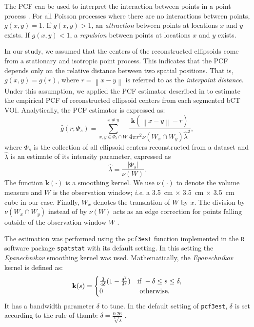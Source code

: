 \documentclass[journal]{IEEEtran}
\newcommand{\norm}[1]{\left\lVert#1\right\rVert}%
\begin{document}
The PCF can be used to interpret the interaction between points in a
point process \cite{illian2008statistical}. For all Poisson processes
where there are no interactions between points, $g(x,y)=1$. If
$g(x,y)>1$, an \textit{attraction} between points at locations $x$ and
$y$ exists. If $g(x,y)<1$, a \textit{repulsion} between points at
locations $x$ and $y$ exists.

In our study, we assumed that the centers of the reconstructed
ellipsoids come from a stationary and isotropic point process. This
indicates that the PCF depends only on the relative distance between
two spatial positions. That is, $g(x, y) = g(r)$, where
$r = \norm{x-y}$ is referred to as the \textit{interpoint
  distance}. Under this assumption, we applied the PCF estimator
described in \cite[p232]{illian2008statistical} to estimate the
empirical PCF of reconstructed ellipsoid centers from each segmented
bCT VOI. Analytically, the PCF estimator is expressed as:
\begin{equation}
  \label{eq:pcf-estimator}
  \hat{g}(r; \Phi_s) = \sum^{x \neq y}_{x, y \in \Phi_s \cap W}
  \frac{\mathbf{k}(\norm{x-y} - r)}
  {4 \pi r^2 \nu(W_x \cap W_y) \hat{\lambda}^2},
\end{equation}
where $\Phi_s$ is the collection of all ellipsoid centers
reconstructed from a dataset and $\hat{\lambda}$ is an estimate of its
intensity parameter, expressed as
\begin{equation}
  \label{eq:inten-estimtor}
  \hat{\lambda} = \frac{|\Phi_s|}{\nu(W)}.
\end{equation}
The function $\mathbf{k}(\cdot)$ is a smoothing kernel. We use
$\nu(\cdot)$ to denote the volume measure and $W$ is the observation
window; \textit{i.e.} a \SI{3.5}{\cm} $\times$ \SI{3.5}{\cm} $\times$
\SI{3.5}{\cm} cube in our case. Finally, $W_x$ denotes the translation
of $W$ by $x$. The division by $\nu(W_x \cap W_y)$ instead of by
$\nu(W)$ acts as an edge correction for points falling outside of the
observation window $W$ \cite{ohser1983estimators}.

The estimation was performed using the \texttt{pcf3est} function
implemented in the \texttt{R} software package \texttt{spatstat}
\cite{baddeley2005spatstat} with its default setting. In this setting
the \textit{Epanechnikov} smoothing kernel \cite{chiu2013stochastic}
was used. Mathematically, the \textit{Epanechnikov} kernel is defined
as:
\begin{equation}
  \label{eq:epan-kernel}
  \mathbf{k}(s) =
  \begin{cases}
    \frac{3}{4\delta} (1 - \frac{s^2}{\delta^2}) & \textnormal{if }
    -\delta \leq s \leq \delta, \\
    0 & \textnormal{ otherwise}.
  \end{cases}
\end{equation}
It has a bandwidth parameter $\delta$ to tune. In the default setting
of \texttt{pcf3est}, $\delta$ is set according to the rule-of-thumb:
$\delta = \frac{0.26}{\sqrt[3]{\hat{\lambda}}}$
\cite{baddeley2005spatstat}.
\end{document}
